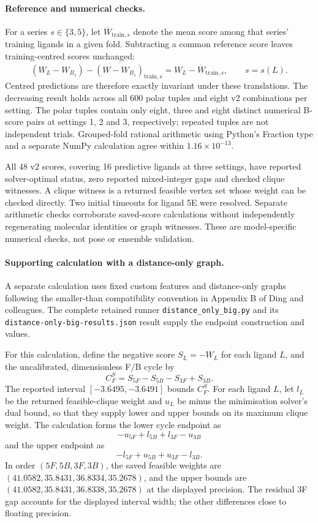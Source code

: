 \documentclass{article}
\begin{document}
\paragraph{Reference and numerical checks.}
For a series \(s\in\{3,5\}\), let \(\overline W_{\mathrm{train},s}\) denote the mean score among that series' training ligands in a given fold. Subtracting a common reference score leaves training-centred scores unchanged:
\[
 (W_L-W_{B_s})
 -\overline{(W-W_{B_s})}_{\mathrm{train},s}
 =W_L-\overline W_{\mathrm{train},s},
 \qquad s=s(L).
\]
Centred predictions are therefore exactly invariant under these translations. The decreasing result holds across all 600 polar tuples and eight v2 combinations per setting. The polar tuples contain only eight, three and eight distinct numerical B-score pairs at settings 1, 2 and 3, respectively; repeated tuples are not independent trials. Grouped-fold rational arithmetic using Python's Fraction type and a separate NumPy calculation agree within \(1.16\times10^{-13}\).

All 48 v2 scores, covering 16 predictive ligands at three settings, have reported solver-optimal status, zero reported mixed-integer gaps and checked clique witnesses. A clique witness is a returned feasible vertex set whose weight can be checked directly. Two initial timeouts for ligand 5E were resolved. Separate arithmetic checks corroborate saved-score calculations without independently regenerating molecular identities or graph witnesses. These are model-specific numerical checks, not pose or ensemble validation.

\paragraph{Supporting calculation with a distance-only graph.}
A separate calculation uses fixed custom features and distance-only graphs following the smaller-than compatibility convention in Appendix B of Ding and colleagues. The complete retained runner \texttt{distance\_only\_big.py} and its \texttt{distance-only-big-results.json} result supply the endpoint construction and values.

For this calculation, define the negative score \(S_L=-W_L\) for each ligand \(L\), and the uncalibrated, dimensionless F/B cycle by
\[
 C_F^S=S_{5F}-S_{5B}-S_{3F}+S_{3B}.
\]
The reported interval \([-3.6495,-3.6491]\) bounds \(C_F^S\). For each ligand \(L\), let \(l_L\) be the returned feasible-clique weight and \(u_L\) be minus the minimisation solver's dual bound, so that they supply lower and upper bounds on its maximum clique weight. The calculation forms the lower cycle endpoint as
\[
 -u_{5F}+l_{5B}+l_{3F}-u_{3B}
\]
and the upper endpoint as
\[
 -l_{5F}+u_{5B}+u_{3F}-l_{3B}.
\]
In order \((5F,5B,3F,3B)\), the saved feasible weights are \((41.0582,35.8431,36.8334,35.2678)\), and the upper bounds are \((41.0582,35.8431,36.8338,35.2678)\) at the displayed precision. The residual 3F gap accounts for the displayed interval width; the other differences close to floating precision.
\end{document}
